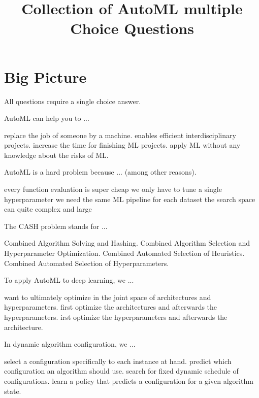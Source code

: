 \documentclass{exam}
\title{Collection of AutoML multiple Choice Questions}
\begin{document}
	\maketitle
	\section{Big Picture}
	All questions require a single choice answer.
	\begin{questions}
		
		\question AutoML can help you to ...
		\begin{choices}
			\choice replace the job of someone by a machine.
			\choice enables efficient interdisciplinary projects.
			\choice increase the time for finishing ML projects.
			\choice apply ML without any knowledge about the risks of ML.
		\end{choices}
		
		\question AutoML is a hard problem because ... (among other reasons).
		\begin{choices}
			\choice every function evaluation is super cheap
			\choice we only have to tune a single hyperparameter
			\choice we need the same ML pipeline for each dataset
			\choice the search space can quite complex and large
		\end{choices}
		
		\question The CASH problem stands for ...
		\begin{choices}
			\choice Combined Algorithm Solving and Hashing.
			\choice Combined Algorithm Selection and Hyperparameter Optimization.
			\choice Combined Automated Selection of Heuristics.
			\choice Combined Automated Selection of Hyperparameters.
		\end{choices}
		
		\question  To apply AutoML to deep learning, we ...
		\begin{choices}
			\choice want to ultimately optimize in the joint space of architectures and hyperparameters.
			\choice first optimize the architectures and afterwards the hyperparameters.
			\choice irst optimize the hyperparameters and afterwards the architecture.
		\end{choices}
		
		\question In dynamic algorithm configuration, we ...
		\begin{choices}
			\choice select a configuration specifically to each instance at hand.
			\choice predict which configuration an algorithm should use.
			\choice search for fixed dynamic schedule of configurations.
			\choice learn a policy that predicts a configuration for a given algorithm state.
		\end{choices}
		

\end{questions}
\end{document}
